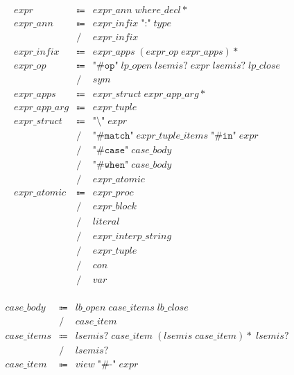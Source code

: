 \begin{align*}
    \begin{array}{rcll}
        \mathit{expr}
        &\Coloneq &\mathit{expr\_ann}\; \mathit{where\_decl}{*} \\
        \mathit{expr\_ann}
        &\Coloneq &\mathit{expr\_infix}\; \texttt{":"}\; \mathit{type} \\
        &\mathrel{/} &\mathit{expr\_infix} \\
        \mathit{expr\_infix}
        &\Coloneq &\mathit{expr\_apps}\; (\mathit{expr\_op}\; \mathit{expr\_apps}){*} \\
        \mathit{expr\_op}
        &\Coloneq &\texttt{"\#op"}\; \mathit{lp\_open}\; \mathit{lsemis}{?}\; \mathit{expr}\; \mathit{lsemis}{?}\; \mathit{lp\_close} \\
        &\mathrel{/} &\mathit{sym} \\
        \mathit{expr\_apps}
        &\Coloneq &\mathit{expr\_struct}\; \mathit{expr\_app\_arg}{*} \\
        \mathit{expr\_app\_arg}
        &\Coloneq &\mathit{expr\_tuple} \\
        \mathit{expr\_struct}
        &\Coloneq &\texttt{"\textbackslash"}\; \mathit{expr} \\
        &\mathrel{/} &\texttt{"\#match"}\; \mathit{expr\_tuple\_items}\; \texttt{"\#in"}\; \mathit{expr} \\
        &\mathrel{/} &\texttt{"\#case"}\; \mathit{case\_body} \\
        &\mathrel{/} &\texttt{"\#when"}\; \mathit{case\_body} \\
        &\mathrel{/} &\mathit{expr\_atomic} \\
        \mathit{expr\_atomic}
        &\Coloneq &\mathit{expr\_proc} \\
        &\mathrel{/} &\mathit{expr\_block} \\
        &\mathrel{/} &\mathit{literal} \\
        &\mathrel{/} &\mathit{expr\_interp\_string} \\
        &\mathrel{/} &\mathit{expr\_tuple} \\
        &\mathrel{/} &\mathit{con} \\
        &\mathrel{/} &\mathit{var}
    \end{array}
\end{align*}

\begin{align*}
    \begin{array}{rcll}
        \mathit{case\_body}
        &\Coloneq &\mathit{lb\_open}\; \mathit{case\_items}\; \mathit{lb\_close} \\
        &\mathrel{/} &\mathit{case\_item} \\
        \mathit{case\_items}
        &\Coloneq &\mathit{lsemis}{?}\; \mathit{case\_item}\; (\mathit{lsemis}\; \mathit{case\_item}){*}\; \mathit{lsemis}{?} \\
        &\mathrel{/} &\mathit{lsemis}{?} \\
        \mathit{case\_item}
        &\Coloneq &\mathit{view}\; \texttt{"\#-"}\; \mathit{expr}
    \end{array}
\end{align*}

